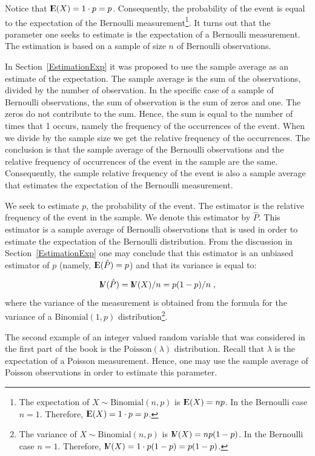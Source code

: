 \documentclass[]{krantz}
\newcommand{\Expec}{{\rm I\kern-.3em E}}
\newcommand{\Var}{{\rm I\kern-.3em V}}
\theoremstyle{definition}
\theoremstyle{definition}
\theoremstyle{definition}
\theoremstyle{remark}
\begin{document}
Notice that \(\Expec(X) = 1 \cdot p = p\). Consequently, the probability
of the event is equal to the expectation of the Bernoulli
measurement\footnote{The expectation of \(X\sim\mathrm{Binomial}(n,p)\) is
  \(\Expec(X)=np\). In the Bernoulli case \(n=1\). Therefore,
  \(\Expec(X) = 1\cdot p = p\).}. It turns out that the parameter one seeks to estimate
is the expectation of a Bernoulli measurement. The estimation is based
on a sample of size \(n\) of Bernoulli observations.

In Section~\ref{EstimationExp} it was proposed to use the sample
average as an estimate of the expectation. The sample average is the sum
of the observations, divided by the number of observation. In the
specific case of a sample of Bernoulli observations, the sum of
observation is the sum of zeros and one. The zeros do not contribute to
the sum. Hence, the sum is equal to the number of times that 1 occurs,
namely the frequency of the occurrences of the event. When we divide by
the sample size we get the relative frequency of the occurrences. The
conclusion is that the sample average of the Bernoulli observations and
the relative frequency of occurrences of the event in the sample are the
same. Consequently, the sample relative frequency of the event is also a
sample average that estimates the expectation of the Bernoulli
measurement.

We seek to estimate \(p\), the probability of the event. The estimator is
the relative frequency of the event in the sample. We denote this
estimator by \(\hat P\). This estimator is a sample average of Bernoulli
observations that is used in order to estimate the expectation of the
Bernoulli distribution. From the discussion in
Section~\ref{EstimationExp} one may conclude that this estimator is an
unbiased estimator of \(p\) (namely, \(\Expec(\hat P) = p\)) and that its
variance is equal to:

\[\Var(\hat P) = \Var(X) / n = p(1-p)/n\;,\] where
the variance of the measurement is obtained from the formula for the
variance of a \(\mathrm{Binomial}(1,p)\) distribution\footnote{The variance of \(X\sim\mathrm{Binomial}(n,p)\) is
  \(\Var(X)=np(1-p)\). In the Bernoulli case \(n=1\). Therefore,
  \(\Var(X) = 1\cdot p(1-p) = p(1-p)\).}.

The second example of an integer valued random variable that was
considered in the first part of the book is the
\(\mathrm{Poisson}(\lambda)\) distribution. Recall that \(\lambda\) is the
expectation of a Poisson measurement. Hence, one may use the sample
average of Poisson observations in order to estimate this parameter.
\end{document}
